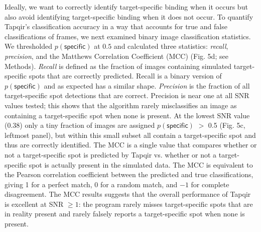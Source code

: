 Ideally, we want to correctly identify target-specific binding when it occurs but also avoid identifying target-specific binding when it does not occur. To quantify Tapqir's classification accuracy in a way that accounts for true and false classifications of frames, we next examined binary image classification statistics. We thresholded $p(\mathsf{specific})$ at $0.5$ and calculated three statistics: \textit{recall}, \textit{precision}, and the Matthews Correlation Coefficient (MCC) \cite{Matthews1975-rw} (Fig. 5d; see Methods). \textit{Recall} is defined as the fraction of images containing simulated target-specific spots that are correctly predicted. Recall is a binary version of $p(\mathsf{specific})$ and as expected has a similar shape. \textit{Precision} is the fraction of all target-specific spot detections that are correct. Precision is near one at all SNR values tested; this shows that the algorithm rarely misclassifies an image as containing a target-specific spot when none is present. At the lowest SNR value (0.38) only a tiny fraction of images are assigned $p(\mathsf{specific})$ $>$ 0.5 (Fig. 5c, leftmost panel), but within this small subset all contain a target-specific spot and thus are correctly identified. The MCC is a single value that compares whether or not a target-specific spot is predicted by Tapqir vs. whether or not a target-specific spot is actually present in the simulated data.  The MCC is equivalent to the Pearson correlation coefficient between the predicted and true classifications, giving 1 for a perfect match, 0 for a random match, and $-1$ for complete disagreement. The MCC results suggests that the overall performance of Tapqir is excellent at SNR $\ge 1$: the program rarely misses target-specific spots that are in reality present and rarely falsely reports a target-specific spot when none is present.  


